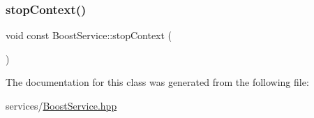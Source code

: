 \mbox{\label{classBoostService_aff4e11e835ba4961f30f51c7bfa6be6e}} 
\subsubsection{\texorpdfstring{stop\+Context()}{stopContext()}}
{\footnotesize\ttfamily void const Boost\+Service\+::stop\+Context (\begin{DoxyParamCaption}{ }\end{DoxyParamCaption})\hspace{0.3cm}{\ttfamily [inline]}}



The documentation for this class was generated from the following file\+:\begin{DoxyCompactItemize}
\item 
services/\mbox{\hyperlink{BoostService_8hpp}{Boost\+Service.\+hpp}}\end{DoxyCompactItemize}
